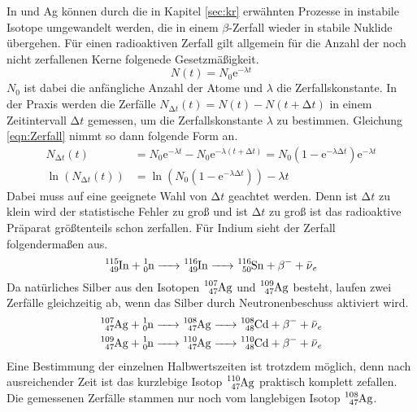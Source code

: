 In und Ag können durch die in Kapitel \ref{sec:kr} erwähnten Prozesse in instabile Isotope umgewandelt werden, die in einem $\beta$-Zerfall wieder in stabile Nuklide übergehen.
Für einen radioaktiven Zerfall gilt allgemein für die Anzahl der noch nicht zerfallenen Kerne folgenede Gesetzmäßigkeit.
\begin{equation}
  N(t) = N_0 \text{e}^{-\lambda t}
  \label{eqn:Zerfall}
\end{equation}
$N_0$ ist dabei die anfängliche Anzahl der Atome und $\lambda$ die Zerfallskonstante.
In der Praxis werden die Zerfälle $N_{\increment t}(t) = N(t) - N(t + \increment t)$ in einem Zeitintervall $\increment t$ gemessen, um die Zerfallskonstante $\lambda$ zu bestimmen.
Gleichung \eqref{eqn:Zerfall} nimmt so dann folgende Form an.
\begin{align}
  N_{\increment t}(t) &= N_0 \text{e}^{-\lambda t} - N_0 \text{e}^{-\lambda (t + \increment t)} = N_0 (1 -\text{e}^{-\lambda \increment t}) \text{e}^{-\lambda t} \\
  \ln(N_{\increment t}(t)) &= \ln(N_0 (1 -\text{e}^{-\lambda \increment t})) - \lambda t
\end{align}
Dabei muss auf eine geeignete Wahl von $\increment t$ geachtet werden.
Denn ist $\increment t$ zu klein wird der statistische Fehler zu groß und ist $\increment t$  zu groß ist das radioaktive Präparat größtenteils schon zerfallen.
Für Indium sieht der Zerfall folgendermaßen aus.
\begin{equation}
  \ce{^{115}_49In + ^{1}_0n -> ^{116}_49In -> ^{116}_50Sn + \beta^- + \bar{\nu}_e}
\end{equation}
Da natürliches Silber aus den Isotopen $\ce{^{107}_47Ag}$ und $\ce{^{109}_47Ag}$ besteht, laufen zwei Zerfälle gleichzeitig ab, wenn das Silber durch Neutronenbeschuss aktiviert wird.
\begin{align}
  \ce{^{107}_47Ag + ^{1}_0n -> ^{108}_47Ag -> ^{108}_48Cd + \beta^- + \bar{\nu}_e} \\
  \ce{^{109}_47Ag + ^{1}_0n -> ^{110}_47Ag -> ^{110}_48Cd + \beta^- + \bar{\nu}_e}
\end{align}
Eine Bestimmung der einzelnen Halbwertszeiten ist trotzdem möglich, denn nach ausreichender Zeit ist das kurzlebige Isotop $\ce{^{110}_47Ag}$ praktisch komplett zefallen.
Die gemessenen Zerfälle stammen nur noch vom langlebigen Isotop $\ce{^{108}_47Ag}$. \cite{V702}
